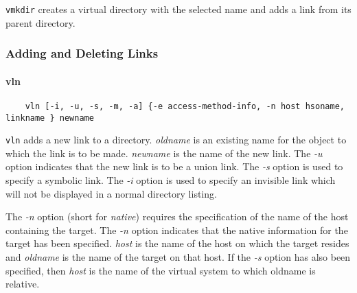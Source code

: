 {\tt vmkdir} creates a virtual directory with the selected name and
adds a link from its parent directory.

\subsubsection{Adding and Deleting Links}

\paragraph{vln}

\begin{verbatim}
    vln [-i, -u, -s, -m, -a] {-e access-method-info, -n host hsoname, linkname } newname
\end{verbatim}

{\tt vln} adds a new link to a directory.  {\em oldname} is an
existing name for the object to which the link is to be made.  {\em
newname} is the name of the new link.  The {\em -u} option indicates
that the new link is to be a union link.  The {\em -s} option is used
to specify a symbolic link.  The {\em -i} option is used to specify an
invisible link which will not be displayed in a normal directory listing.

The {\em -n} option (short for {\em native})  requires the specification of the
name of the host containing the target.  The {\em -n} option indicates
that the native information for the target has been specified.  {\em
host} is the name of the host on which the target resides and {\em
oldname} is the name of the target on that host.  If the {\em -s}
option has also been specified, then {\em host} is the name of the
virtual system to which oldname is relative.

